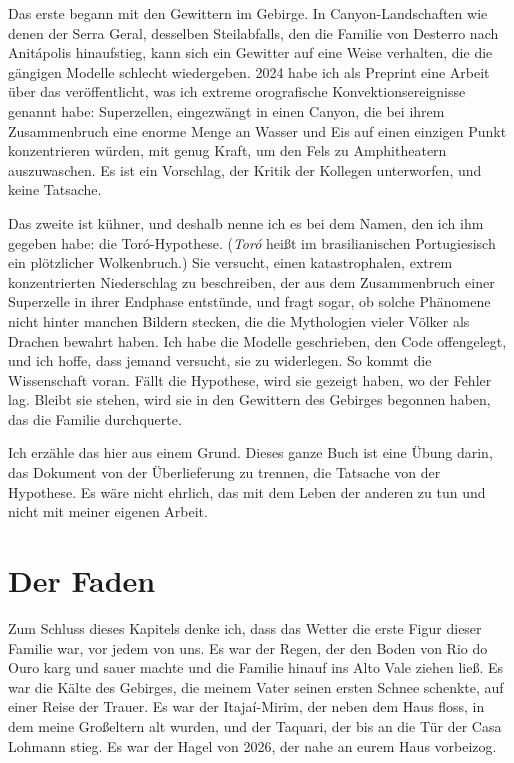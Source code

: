 \documentclass[
  ngerman,
  11pt,
  openany]{book}
\begin{document}
Das erste begann mit den Gewittern im Gebirge. In Canyon-Landschaften
wie denen der Serra Geral, desselben Steilabfalls, den die Familie von
Desterro nach Anitápolis hinaufstieg, kann sich ein Gewitter auf eine
Weise verhalten, die die gängigen Modelle schlecht wiedergeben. 2024
habe ich als Preprint eine Arbeit über das veröffentlicht, was ich
extreme orografische Konvektionsereignisse genannt habe: Superzellen,
eingezwängt in einen Canyon, die bei ihrem Zusammenbruch eine enorme
Menge an Wasser und Eis auf einen einzigen Punkt konzentrieren würden,
mit genug Kraft, um den Fels zu Amphitheatern auszuwaschen. Es ist ein
Vorschlag, der Kritik der Kollegen unterworfen, und keine Tatsache.

Das zweite ist kühner, und deshalb nenne ich es bei dem Namen, den ich
ihm gegeben habe: die Toró-Hypothese. (\emph{Toró} heißt im
brasilianischen Portugiesisch ein plötzlicher Wolkenbruch.) Sie
versucht, einen katastrophalen, extrem konzentrierten Niederschlag zu
beschreiben, der aus dem Zusammenbruch einer Superzelle in ihrer
Endphase entstünde, und fragt sogar, ob solche Phänomene nicht hinter
manchen Bildern stecken, die die Mythologien vieler Völker als Drachen
bewahrt haben. Ich habe die Modelle geschrieben, den Code offengelegt,
und ich hoffe, dass jemand versucht, sie zu widerlegen. So kommt die
Wissenschaft voran. Fällt die Hypothese, wird sie gezeigt haben, wo der
Fehler lag. Bleibt sie stehen, wird sie in den Gewittern des Gebirges
begonnen haben, das die Familie durchquerte.

Ich erzähle das hier aus einem Grund. Dieses ganze Buch ist eine Übung
darin, das Dokument von der Überlieferung zu trennen, die Tatsache von
der Hypothese. Es wäre nicht ehrlich, das mit dem Leben der anderen zu
tun und nicht mit meiner eigenen Arbeit.

\section{Der Faden}\label{der-faden}

Zum Schluss dieses Kapitels denke ich, dass das Wetter die erste Figur
dieser Familie war, vor jedem von uns. Es war der Regen, der den Boden
von Rio do Ouro karg und sauer machte und die Familie hinauf ins Alto
Vale ziehen ließ. Es war die Kälte des Gebirges, die meinem Vater seinen
ersten Schnee schenkte, auf einer Reise der Trauer. Es war der
Itajaí-Mirim, der neben dem Haus floss, in dem meine Großeltern alt
wurden, und der Taquari, der bis an die Tür der Casa Lohmann stieg. Es
war der Hagel von 2026, der nahe an eurem Haus vorbeizog.
\end{document}
